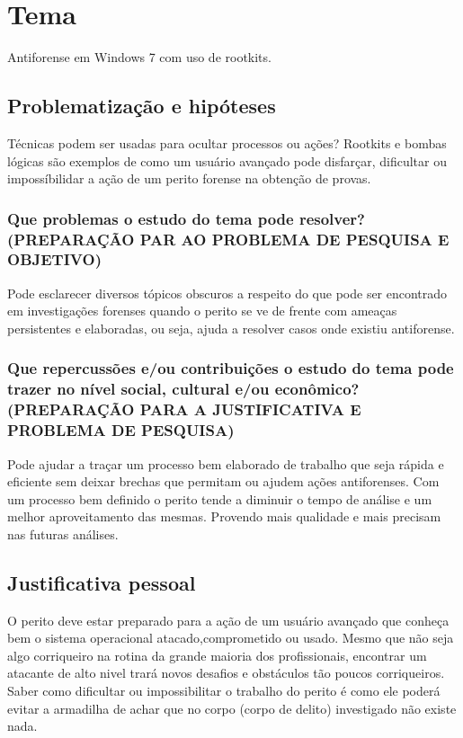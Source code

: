 \chapter*{Tema}

Antiforense em Windows 7 com uso de rootkits.

\section{Problematização e hipóteses}

Técnicas podem ser usadas para ocultar processos ou ações? Rootkits e bombas lógicas são exemplos de como um usuário avançado pode disfarçar, dificultar ou impossíbilidar a ação de um perito forense na obtenção de provas.

\subsection{Que problemas o estudo do tema pode resolver? (PREPARAÇÃO PAR AO PROBLEMA DE PESQUISA E OBJETIVO)}

Pode esclarecer diversos tópicos obscuros a respeito do que pode ser encontrado em investigações forenses quando o perito se ve de frente com ameaças persistentes e elaboradas, ou seja, ajuda a resolver casos onde existiu antiforense.

\subsection{Que repercussões e/ou contribuições o estudo do tema pode trazer no nível social, cultural e/ou econômico?(PREPARAÇÃO PARA A JUSTIFICATIVA E PROBLEMA DE PESQUISA)}

Pode ajudar a traçar um processo bem elaborado de trabalho que seja rápida e eficiente sem deixar brechas que permitam ou ajudem ações antiforenses. Com um processo bem definido o perito tende a diminuir o tempo de análise e um melhor aproveitamento das mesmas. Provendo mais qualidade e mais precisam nas futuras análises.

\section{Justificativa pessoal}
O perito deve estar preparado para a ação de um usuário avançado que conheça bem o sistema operacional atacado,comprometido ou usado. Mesmo que não seja algo corriqueiro na rotina da grande maioria dos profissionais, encontrar um atacante de alto nivel trará novos desafios e obstáculos tão poucos corriqueiros. Saber como dificultar ou impossibilitar o trabalho do perito é como ele poderá evitar a armadilha de achar que no corpo (corpo de delito) investigado não existe nada.

